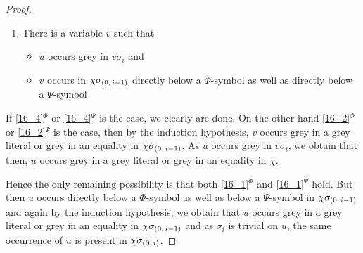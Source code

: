 \documentclass[,%
	draft=false,%
	numbers=noendperiod
	12pt,
	a4paper,
	oneside,%
	openany,
]{memoir}
\newcommand{\inv}{\ensuremath{\chi}}
\begin{document}
\begin{proof}
\begin{enumerate}
		\item 
			\label{16_2}
			There is a variable $v$ such that 
			{
				\renewcommand{\labelitemi}{\textendash}
				\begin{itemize}
					\item $u$ occurs grey in $v\sigma_i$ and
					\item $v$ occurs in $\inv\sigmazmi$ directly below a $\Phi$-symbol as well as directly below a $\Psi$-symbol
				\end{itemize}
			}
	\end{enumerate}

	If \ref{16_4}$^\Phi$ or \ref{16_4}$^\Psi$ is the case, we clearly are done.
	On the other hand \ref{16_2}$^\Phi$ or \ref{16_2}$^\Psi$ is the case, then by the induction hypothesis, $v$ occurs grey in a grey literal or grey in an equality in $\inv\sigmazmi$. 
	As $u$ occurs grey in $v\sigma_i$, we obtain that then, $u$ occurs grey in a grey literal or grey in an equality in $\inv$.

	Hence the only remaining possibility is that both \ref{16_1}$^\Phi$
	and \ref{16_1}$^\Psi$ hold.
	But then $u$ occurs directly below a $\Phi$-symbol as well as below a $\Psi$-symbol in $\inv\sigmazmi$ and again by the induction hypothesis, we obtain that $u$ occurs grey in a grey literal or grey in an equality in $\inv\sigmazmi$ and as $\sigma_i$ is trivial on $u$, the same occurrence of $u$ is present in $\inv\sigmazi$.
\end{proof}
\end{document}
